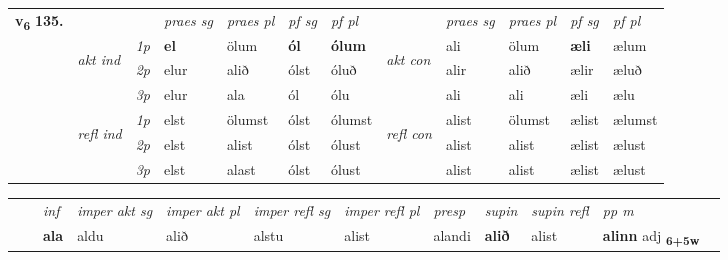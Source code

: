 \begin{tabular}{llllllllllll} \toprule
\multirow{4}{*}{{{\textbf{v{\textsubscript{6}}} \Large{\textbf{135.}}}}}  & &   &  \textit{praes sg}  & \textit{praes pl}  &\textit{ pf sg} & \textit{pf pl} &  &  \textit{praes sg}  & \textit{praes pl}  & \textit{pf sg} & \textit{pf pl } \\*
	\cmidrule{4-7} \cmidrule{9-12}
 & \multirow{3}{*}{\begin{turn}{90}\textit{akt ind}\end{turn}} & {\textit{1p}} & \textbf{el} & ölum    & \textbf{ól} & \textbf{ólum} & \multirow{3}{*}{\begin{turn}{90}\textit{akt con}\end{turn}} &ali & ölum & \textbf{æli} & ælum\\*
& &  {\textit{2p}} &  elur  & alið   & ólst & óluð & & alir & alið & ælir & æluð \\*
& &  {\textit{3p}} & elur & ala   & ól & ólu & & ali & ali& æli & ælu  \\*
\cmidrule{4-7} \cmidrule{9-12}
 &\multirow{3}{*}{\begin{turn}{90}\textit{refl ind}\end{turn}} & {\textit{1p}} & elst & ölumst    & ólst & ólumst & \multirow{3}{*}{\begin{turn}{90}\textit{refl con}\end{turn}}  &alist & ölumst & ælist & ælumst\\*
 &&  {\textit{2p}} &  elst  & alist   & ólst & ólust & &alist & alist & ælist & ælust \\*
& &  {\textit{3p}} & elst & alast   & ólst & ólust & & alist & alist& ælist & ælust  \\*
\cmidrule{4-7} \cmidrule{9-12}
\end{tabular}


\begin{tabular}{llllllllllll}
 & & \textit{inf} & \textit{imper akt sg} & \textit{imper akt pl} & \textit{imper refl sg} & \textit{imper refl pl} & \textit{presp} & \textit{supin} & \textit{supin refl} & \textit{pp m}     \\*
  & & \textbf{ala} & aldu  & alið & alstu & alist & alandi &  \textbf{alið} & alist & \textbf{alinn} adj \textbf{\textsubscript{6+5w}} \\*
\cmidrule{1-12}
\end{tabular}



